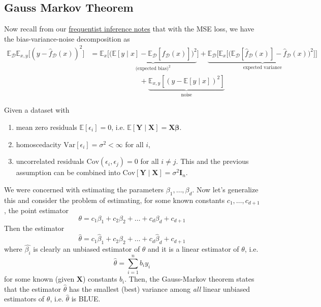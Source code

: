 \subsection{Gauss Markov Theorem}

  Now recall from our \hyperref[fi-bias_variance_mse]{frequentist inference notes} that with the MSE loss, we have the bias-variance-noise decomposition as 
  \begin{align}
    \mathbb{E}_{\mathcal{D}} \mathbb{E}_{x, y} \big[ (y - \hat{f}_{\mathcal{D}}(x))^2 \big] 
    & = \mathbb{E}_{x} \big[ \underbrace{ \big( \mathbb{E}[y \mid x] - \mathbb{E}_{\mathcal{D}} [\hat{f}_\mathcal{D} (x)] \big)^2}_{\text{(expected bias)}^2} \big] + \underbrace{ \mathbb{E}_\mathcal{D} \big[ \mathbb{E}_{x} \big[ \big( \mathbb{E}_\mathcal{D} [\hat{f}_\mathcal{D} (x)] - \hat{f}_\mathcal{D} (x) \big)^2 \big] \big]}_{\text{expected variance}} \\ 
    & \;\;\;\;\;\;\;\;\;\;\;\;\;\;\;\;\;\;\;\;\;\;\;\;\; + \underbrace{\mathbb{E}_{x, y} [(y - \mathbb{E}[y \mid x])^2]}_{\text{noise}}
  \end{align}

  \begin{theorem}
    Given a dataset with 
    \begin{enumerate}
      \item mean zero residuals $\mathbb{E}[\epsilon_i] = 0$, i.e. $\mathbb{E}[\mathbf{Y} \mid \mathbf{X}] = \mathbf{X} \boldsymbol{\beta}$. 
      \item homoscedacity $\mathrm{Var}[\epsilon_i] = \sigma^2 < \infty$ for all $i$, 
      \item uncorrelated residuals $\mathrm{Cov}(\epsilon_i, \epsilon_j) = 0$ for all $i \neq j$. This and the previous assumption can be combined into $\mathrm{Cov}[\mathbf{Y} \mid \mathbf{X}] = \sigma^2 \mathbf{I}_n$. 
    \end{enumerate}
    We were concerned with estimating the parameters $\beta_1, \ldots, \beta_d$. Now let's generalize this and consider the problem of estimating, for some known constants $c_1, \ldots, c_{d+1}$, the point estimator 
    \begin{equation}
      \theta = c_1 \beta_1 + c_2 \beta_2 + \ldots + c_d \beta_d + c_{d+1}
    \end{equation}
    Then the estimator 
    \begin{equation}
      \hat{\theta} = c_1 \hat{\beta}_1 + c_2 \hat{\beta}_2 + \ldots + c_d \hat{\beta}_d + c_{d+1}
    \end{equation}
    where $\hat{\beta_i}$ is clearly an unbiased estimator of $\theta$ and it is a linear estimator of $\theta$, i.e. 
    \begin{equation}
      \hat{\theta} = \sum_{i=1}^n b_i y_i
    \end{equation}
    for some known (given $\mathbf{X}$) constants $b_i$. Then, the Gauss-Markov theorem states that the estimator $\hat{\theta}$ has the smallest (best) variance among \textit{all} linear unbiased estimators of $\theta$, i.e. $\hat{\theta}$ is BLUE. 
  \end{theorem}

